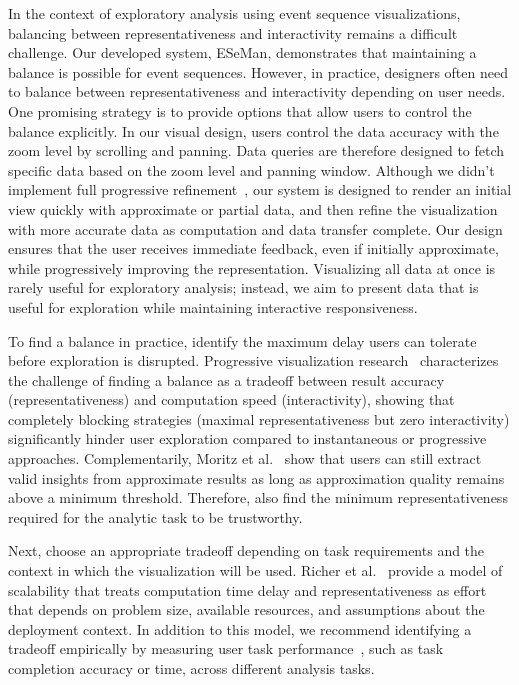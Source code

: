 \begin{refsection}
In the context of exploratory analysis using event sequence visualizations, balancing between representativeness and interactivity remains a difficult challenge. Our developed system, ESeMan, demonstrates that maintaining a balance is possible for event sequences. However, in practice, designers often need to balance between representativeness and interactivity depending on user needs. One promising strategy is to provide options that allow users to control the balance explicitly. In our visual design, users control the data accuracy with the zoom level by scrolling and panning. Data queries are therefore designed to fetch specific data based on the zoom level and panning window. Although we didn't implement full progressive refinement~\cite{stolper2014progressive}, our system is designed to render an initial view quickly with approximate or partial data, and then refine the visualization with more accurate data as computation and data transfer complete. Our design ensures that the user receives immediate feedback, even if initially approximate, while progressively improving the representation. Visualizing all data at once is rarely useful for exploratory analysis; instead, we aim to present data that is useful for exploration while maintaining interactive responsiveness.

To find a balance in practice, identify the maximum delay users can tolerate before exploration is disrupted. Progressive visualization research~\cite{zgraggen2016progressive} characterizes the challenge of finding a balance as a tradeoff between result accuracy (representativeness) and computation speed (interactivity), showing that completely blocking strategies (maximal representativeness but zero interactivity) significantly hinder user exploration compared to instantaneous or progressive approaches. Complementarily, Moritz et al.~\cite{moritz2017trust} show that users can still extract valid insights from approximate results as long as approximation quality remains above a minimum threshold. Therefore, also find the minimum representativeness required for the analytic task to be trustworthy.

Next, choose an appropriate tradeoff depending on task requirements and the context in which the visualization will be used. Richer et al.~\cite{richer2022scalability} provide a model of scalability that treats computation time delay and representativeness as effort that depends on problem size, available resources, and assumptions about the deployment context. In addition to this model, we recommend identifying a tradeoff empirically by measuring user task performance~\cite{lam2011empirical}, such as task completion accuracy or time, across different analysis tasks.


\end{refsection}
